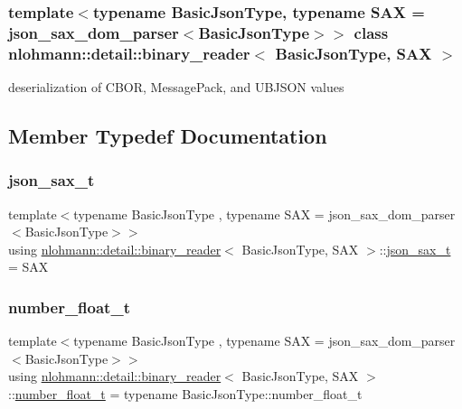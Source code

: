 \subsubsection*{template$<$typename Basic\+Json\+Type, typename S\+AX = json\+\_\+sax\+\_\+dom\+\_\+parser$<$\+Basic\+Json\+Type$>$$>$\newline
class nlohmann\+::detail\+::binary\+\_\+reader$<$ Basic\+Json\+Type, S\+A\+X $>$}

deserialization of C\+B\+OR, Message\+Pack, and U\+B\+J\+S\+ON values 

\subsection{Member Typedef Documentation}
\mbox{\label{classnlohmann_1_1detail_1_1binary__reader_a43c5dc6a3219f64a7824d7ba9c7b14ae}} 
\subsubsection{\texorpdfstring{json\+\_\+sax\+\_\+t}{json\_sax\_t}}
{\footnotesize\ttfamily template$<$typename Basic\+Json\+Type , typename S\+AX  = json\+\_\+sax\+\_\+dom\+\_\+parser$<$\+Basic\+Json\+Type$>$$>$ \\
using \hyperlink{classnlohmann_1_1detail_1_1binary__reader}{nlohmann\+::detail\+::binary\+\_\+reader}$<$ Basic\+Json\+Type, S\+AX $>$\+::\hyperlink{classnlohmann_1_1detail_1_1binary__reader_a43c5dc6a3219f64a7824d7ba9c7b14ae}{json\+\_\+sax\+\_\+t} =  S\+AX\hspace{0.3cm}{\ttfamily [private]}}

\mbox{\label{classnlohmann_1_1detail_1_1binary__reader_af4488e5400da86636fd2f4d0171bbf53}} 
\subsubsection{\texorpdfstring{number\+\_\+float\+\_\+t}{number\_float\_t}}
{\footnotesize\ttfamily template$<$typename Basic\+Json\+Type , typename S\+AX  = json\+\_\+sax\+\_\+dom\+\_\+parser$<$\+Basic\+Json\+Type$>$$>$ \\
using \hyperlink{classnlohmann_1_1detail_1_1binary__reader}{nlohmann\+::detail\+::binary\+\_\+reader}$<$ Basic\+Json\+Type, S\+AX $>$\+::\hyperlink{classnlohmann_1_1detail_1_1binary__reader_af4488e5400da86636fd2f4d0171bbf53}{number\+\_\+float\+\_\+t} =  typename Basic\+Json\+Type\+::number\+\_\+float\+\_\+t\hspace{0.3cm}{\ttfamily [private]}}

